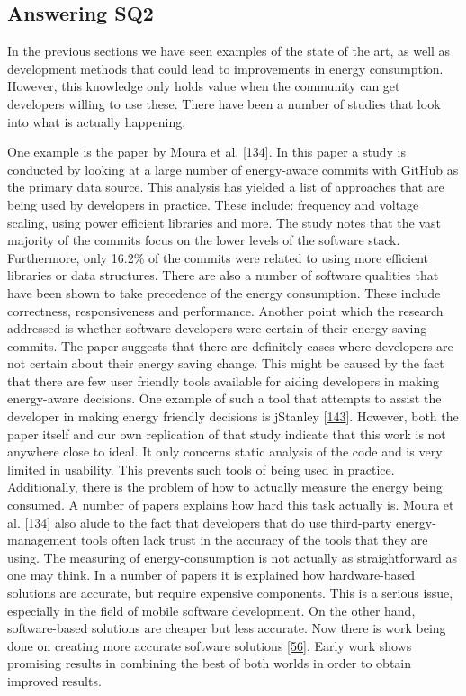\documentclass[]{book}
\begin{document}
\subsection{Answering SQ2}\label{answering-sq2}

In the previous sections we have seen examples of the state of the art,
as well as development methods that could lead to improvements in energy
consumption. However, this knowledge only holds value when the community
can get developers willing to use these. There have been a number of
studies that look into what is actually happening.

One example is the paper by Moura et al.
{[}\protect\hyperlink{ref-MPEC2015}{134}{]}. In this paper a study is
conducted by looking at a large number of energy-aware commits with
GitHub as the primary data source. This analysis has yielded a list of
approaches that are being used by developers in practice. These include:
frequency and voltage scaling, using power efficient libraries and more.
The study notes that the vast majority of the commits focus on the lower
levels of the software stack. Furthermore, only 16.2\% of the commits
were related to using more efficient libraries or data structures. There
are also a number of software qualities that have been shown to take
precedence of the energy consumption. These include correctness,
responsiveness and performance. Another point which the research
addressed is whether software developers were certain of their energy
saving commits. The paper suggests that there are definitely cases where
developers are not certain about their energy saving change. This might
be caused by the fact that there are few user friendly tools available
for aiding developers in making energy-aware decisions. One example of
such a tool that attempts to assist the developer in making energy
friendly decisions is jStanley
{[}\protect\hyperlink{ref-PSCS2018}{143}{]}. However, both the paper
itself and our own replication of that study indicate that this work is
not anywhere close to ideal. It only concerns static analysis of the
code and is very limited in usability. This prevents such tools of being
used in practice. Additionally, there is the problem of how to actually
measure the energy being consumed. A number of papers explains how hard
this task actually is. Moura et al.
{[}\protect\hyperlink{ref-MPEC2015}{134}{]} also alude to the fact that
developers that do use third-party energy-management tools often lack
trust in the accuracy of the tools that they are using. The measuring of
energy-consumption is not actually as straightforward as one may think.
In a number of papers it is explained how hardware-based solutions are
accurate, but require expensive components. This is a serious issue,
especially in the field of mobile software development. On the other
hand, software-based solutions are cheaper but less accurate. Now there
is work being done on creating more accurate software solutions
{[}\protect\hyperlink{ref-NPPPZL2017}{56}{]}. Early work shows promising
results in combining the best of both worlds in order to obtain improved
results.
\end{document}

